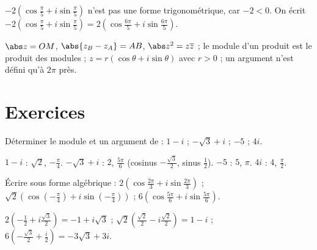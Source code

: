 \begin{pitfall}
$-2\left(\cos\frac\pi5+i\sin\frac\pi5\right)$ n'est pas une forme trigonométrique, car $-2<0$. On écrit $-2\left(\cos\frac\pi5+i\sin\frac\pi5\right)=2\left(\cos\frac{6\pi}5+i\sin\frac{6\pi}5\right)$.
\end{pitfall}
\begin{figurebox}[Module et argument de $z=a+ib$.]
\end{figurebox}
\begin{keypoint}[À retenir]
$\abs z=OM$, $\abs{z_B-z_A}=AB$, $\abs z^2=z\overline z$ ; le module d'un produit est le produit des modules ; $z=r(\cos\theta+i\sin\theta)$ avec $r>0$ ; un argument n'est défini qu'à $2\pi$ près.
\end{keypoint}

\mxnewpage
\section{Exercices}
\begin{exercise}
Déterminer le module et un argument de : $1-i$ ; $-\sqrt3+i$ ; $-5$ ; $4i$.
\end{exercise}
\begin{solution}
$1-i$ : $\sqrt2$, $-\frac\pi4$. $-\sqrt3+i$ : $2$, $\frac{5\pi}6$ (cosinus $-\frac{\sqrt3}2$, sinus $\frac12$). $-5$ : $5$, $\pi$. $4i$ : $4$, $\frac\pi2$.
\end{solution}

\begin{exercise}
Écrire sous forme algébrique : $2\left(\cos\frac{2\pi}3+i\sin\frac{2\pi}3\right)$ ; $\sqrt2\left(\cos\left(-\frac\pi4\right)+i\sin\left(-\frac\pi4\right)\right)$ ; $6\left(\cos\frac{5\pi}6+i\sin\frac{5\pi}6\right)$.
\end{exercise}
\begin{solution}
$2\left(-\frac12+i\frac{\sqrt3}2\right)=-1+i\sqrt3$ ; $\sqrt2\left(\frac{\sqrt2}2-i\frac{\sqrt2}2\right)=1-i$ ; $6\left(-\frac{\sqrt3}2+\frac i2\right)=-3\sqrt3+3i$.
\end{solution}

